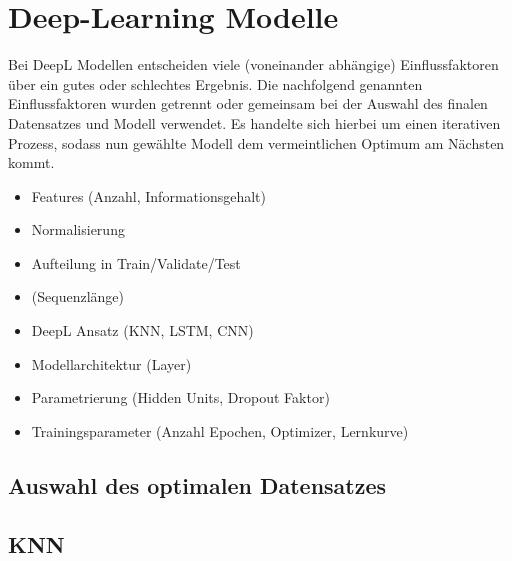 \section{Deep-Learning Modelle}
Bei DeepL Modellen entscheiden viele (voneinander abhängige) Einflussfaktoren über ein gutes oder schlechtes Ergebnis. Die nachfolgend genannten Einflussfaktoren wurden getrennt oder gemeinsam bei der Auswahl des finalen Datensatzes und Modell verwendet. Es handelte sich hierbei um einen iterativen Prozess, sodass nun gewählte Modell dem vermeintlichen Optimum am Nächsten kommt.

\begin{itemize}
  \item Features (Anzahl, Informationsgehalt)
  \item Normalisierung
  \item Aufteilung in Train/Validate/Test
  \item (Sequenzlänge)
  \item DeepL Ansatz (KNN, LSTM, CNN)
  \item Modellarchitektur (Layer)
  \item Parametrierung (Hidden Units, Dropout Faktor)
  \item Trainingsparameter (Anzahl Epochen, Optimizer, Lernkurve)
\end{itemize}


\subsection{Auswahl des optimalen Datensatzes}



\subsection{KNN}



